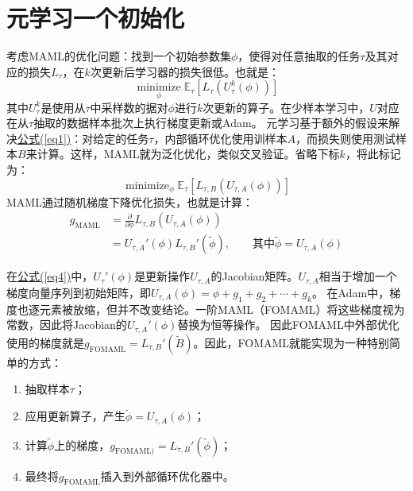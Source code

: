 \documentclass[11pt,twoside,a4paper]{ctexart}
\DeclareMathOperator*{\minimize}{minimize}
\begin{document}
\section{元学习一个初始化}
考虑MAML的优化问题：找到一个初始参数集$\phi$，使得对任意抽取的任务$\tau$及其对应的损失$L_\tau$，在$k$次更新后学习器的损失很低。也就是：
\begin{equation}
	\minimize\limits_{\phi} \mathbb E_\tau \left[ L_\tau\left( U_\tau^k(\phi) \right) \right] \label{eq1}
\end{equation}
其中$U_\tau^k$是使用从$\tau$中采样数的据对$\phi$进行$k$次更新的算子。在少样本学习中，$U$对应在从$\tau$抽取的数据样本批次上执行梯度更新或Adam。
元学习基于额外的假设来解决\hyperref[eq1]{公式(\ref{eq1})}：对给定的任务$\tau$，内部循环优化使用训样本$A$，而损失则使用测试样本$B$来计算。这样，MAML就为泛化优化，类似交叉验证。省略下标$k$，将此标记为：
\begin{equation}
	\minimize_\phi \mathbb E_\tau\left[ L_{\tau,B}\left( U_{\tau,A}(\phi) \right) \right]
\end{equation}
MAML通过随机梯度下降优化损失，也就是计算：
\begin{align}
	g_{\text{MAML}} &= \frac{\partial}{\partial\phi}L_{\tau,B}\left(U_{\tau,A}(\phi)\right)\\
	         &= U_{\tau,A}'(\phi)L_{\tau,B}'\left(\tilde{\phi}\right),\qquad\text{其中} \tilde\phi=U_{\tau,A}(\phi) \label{eq4}
\end{align}

在\hyperref[eq4]{公式(\ref{eq4})}中，$U_{\tau}'(\phi)$是更新操作$U_{\tau,A}$的Jacobian矩阵。$U_{\tau,A}$相当于增加一个梯度向量序列到初始矩阵，即$U_{\tau,A}(\phi)=\phi+g_1+g_2+\cdots+g_k$。
在Adam中，梯度也逐元素被放缩，但并不改变结论。一阶MAML（FOMAML）将这些梯度视为常数，因此将Jacobian的$U_{\tau,A}'(\phi)$替换为恒等操作。
因此FOMAML中外部优化使用的梯度就是$g_{\text{FOMAML}}=L_{\tau,B}'\left(\tilde B\right)$。因此，FOMAML就能实现为一种特别简单的方式：
\renewcommand{\labelenumi}{(\arabic{enumi})}
\begin{enumerate}
	\item 抽取样本$\tau$；
	\item 应用更新算子，产生$\tilde\phi=U_{\tau,A}(\phi)$；
	\item 计算$\tilde\phi$上的梯度，$g_{\text{FOMAML})}=L_{\tau,B}'\left(\tilde\phi\right)$；
	\item 最终将$g_{\text{FOMAML}}$插入到外部循环优化器中。
\end{enumerate}
\end{document}
